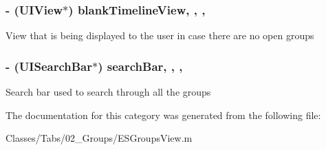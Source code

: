 \subsubsection[{blank\+Timeline\+View}]{\setlength{\rightskip}{0pt plus 5cm}-\/ (U\+I\+View$\ast$) blank\+Timeline\+View\hspace{0.3cm}{\ttfamily [read]}, {\ttfamily [write]}, {\ttfamily [nonatomic]}, {\ttfamily [strong]}}\label{category_e_s_groups_view_07_08_ac87ef0c6673162f8995415427fa4e3dc}
View that is being displayed to the user in case there are no open groups \hypertarget{category_e_s_groups_view_07_08_a1c61813a81e48caf8ec5aafb97f2bdab}{}
\subsubsection[{search\+Bar}]{\setlength{\rightskip}{0pt plus 5cm}-\/ (U\+I\+Search\+Bar$\ast$) search\+Bar\hspace{0.3cm}{\ttfamily [read]}, {\ttfamily [write]}, {\ttfamily [nonatomic]}, {\ttfamily [strong]}}\label{category_e_s_groups_view_07_08_a1c61813a81e48caf8ec5aafb97f2bdab}
Search bar used to search through all the groups 

The documentation for this category was generated from the following file\+:\begin{DoxyCompactItemize}
\item 
Classes/\+Tabs/02\+\_\+\+Groups/E\+S\+Groups\+View.\+m\end{DoxyCompactItemize}

